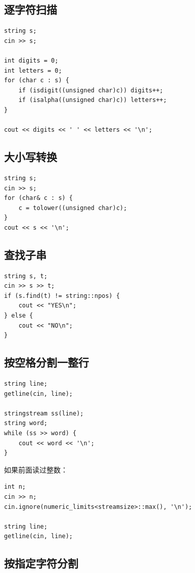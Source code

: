 \subsection{逐字符扫描}

\begin{lstlisting}
string s;
cin >> s;

int digits = 0;
int letters = 0;
for (char c : s) {
    if (isdigit((unsigned char)c)) digits++;
    if (isalpha((unsigned char)c)) letters++;
}

cout << digits << ' ' << letters << '\n';
\end{lstlisting}

\subsection{大小写转换}

\begin{lstlisting}
string s;
cin >> s;
for (char& c : s) {
    c = tolower((unsigned char)c);
}
cout << s << '\n';
\end{lstlisting}

\subsection{查找子串}

\begin{lstlisting}
string s, t;
cin >> s >> t;
if (s.find(t) != string::npos) {
    cout << "YES\n";
} else {
    cout << "NO\n";
}
\end{lstlisting}

\subsection{按空格分割一整行}

\begin{lstlisting}
string line;
getline(cin, line);

stringstream ss(line);
string word;
while (ss >> word) {
    cout << word << '\n';
}
\end{lstlisting}

如果前面读过整数：

\begin{lstlisting}
int n;
cin >> n;
cin.ignore(numeric_limits<streamsize>::max(), '\n');

string line;
getline(cin, line);
\end{lstlisting}

\subsection{按指定字符分割}

